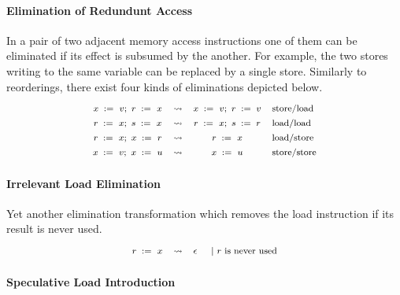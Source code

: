 \paragraph{Elimination of Redundunt Access} 

In a pair of two adjacent memory access instructions 
one of them can be eliminated if its effect 
is subsumed by the another. 
For example, the two stores writing to the same variable 
can be replaced by a single store.  
Similarly to reorderings, there exist four kinds 
of eliminations depicted below. 
%
\[\def\arraystretch{1.4}\footnotesize
  \begin{array}{cccl} 

      \writeInst{}{x}{v} \seq \readInst{}{r}{x} 
    & \leadsto 
    & \writeInst{}{x}{v} \seq \assignInst{r}{v}
    & \text{store/load}  \\ 

      \readInst{}{r}{x} \seq \readInst{}{s}{x} 
    & \leadsto 
    & \readInst{}{r}{x} \seq \assignInst{s}{r}
    & \text{load/load}  \\ 

      \readInst{}{r}{x} \seq \writeInst{}{x}{r} 
    & \leadsto 
    & \readInst{}{r}{x} 
    & \text{load/store}  \\ 

      \writeInst{}{x}{v} \seq \writeInst{}{x}{u} 
    & \leadsto 
    & \writeInst{}{x}{u}
    & \text{store/store}  \\ 

  \end{array}
\]

\paragraph{Irrelevant Load Elimination}

Yet another elimination transformation 
which removes the load instruction if its 
result is never used. 
%
\[\def\arraystretch{1.4}\footnotesize
  \begin{array}{cccl} 

      \readInst{}{r}{x} 
    & \leadsto 
    & \epsInst
    & ~|~ \text{$r$ is never used}  \\ 

  \end{array}
\]

\paragraph{Speculative Load Introduction}

